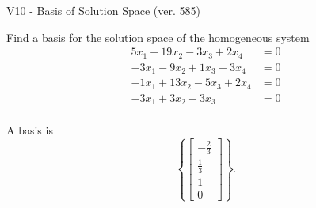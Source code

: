 \begin{exercise}
  \begin{exerciseTitle}V10 - Basis of Solution Space (ver. 585)\end{exerciseTitle}
  \begin{exerciseStatement}
    Find a basis for the solution space of the homogeneous system 
\begin{align*}
 5 x_ 1 + 19 x_ 2 -3 x_ 3 + 2 x_ 4 &= 0  \\ 
  -3 x_ 1 -9 x_ 2 + 1 x_ 3 + 3 x_ 4 &= 0  \\ 
  -1 x_ 1 + 13 x_ 2 -5 x_ 3 + 2 x_ 4 &= 0  \\ 
  -3 x_ 1 + 3 x_ 2 -3 x_ 3 &= 0  \\ 
 \end{align*}


 
  \end{exerciseStatement}

  \begin{exerciseAnswer}
   A basis is   
\[\left\{\left[\begin{array}{c}
-\frac{2}{3} \\
\frac{1}{3} \\
1 \\
0
\end{array}\right]\right\}.\]

  


  \end{exerciseAnswer}
\end{exercise}